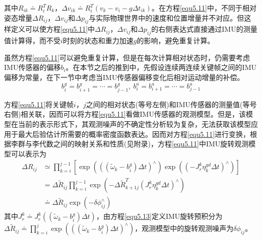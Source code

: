 其中$R_{ik} \doteq R_i^T R_k$，$\Delta v_{ik} \doteq R_i^T \left( v_k -v_i-g\Delta t_{ik} \right)$。在方程\ref{equ5.11}中，不同于相对姿态增量$\Delta R_{ij}$，$\Delta v_{ij}$和$\Delta p_{ij}$与实际物理世界中的速度和位置增量并不对应。但这样定义可以使方程\ref{equ5.11}中$\Delta R_{ij}$，$\Delta v_{ij}$和$\Delta p_{ij}$的右侧表达式直接通过IMU的测量值计算得，而不受$i$时刻的状态和重力加速$g$的影响，避免重复计算。

虽然方程\ref{equ5.11}可以避免重复计算，但是在每次计算相对状态时，仍需要考虑IMU传感器的偏移$b_i$。在本节之后的推到中，先假设连续两连续关键帧之间的IMU偏移为常量，在下一节中考虑当IMU传感器偏移变化后相对运动增量的补偿。
\begin{equation}
\label{equ5.12}
b_i^g = b_{i+1}^g = \cdots = b_{j-1}^g, \  b_i^a = b_{i+1}^a = \cdots = b_{j-1}^a
\end{equation}

方程\ref{equ5.11}将关键帧$i$，$j$之间的相对状态(等号左侧)和IMU传感器的测量值(等号右侧)相关联，因而可以将方程\ref{equ5.11}看做IMU传感器的观测模型。但是，该模型在当前的表示形式下，其观测噪声的不确定性分析较为复杂，无法获取该模型应用于最大后验估计所需要的概率密度函数表达。因而对方程\ref{equ5.11}进行变换，根据李群与李代数之间的映射关系和性质(见附录)，方程\ref{equ5.11}中IMU旋转观测模型可以表示为
\begin{equation}
\label{equ5.13}
\begin{aligned}
\Delta R_{ij} & \simeq \prod\limits_{k=i}^{j-1} \left[ \exp \left( \left( \left( \widetilde{\omega}_k - b_i^g \right) \Delta t \right)^{\wedge}  \right)  
\exp \left( \left( -J_r^k \eta_k^{gd} \Delta t \right)^{\wedge} \right)\right] \\
&= \Delta \widetilde{R}_{ij} \prod\limits_{k=i}^{j-1}\exp \left( -\Delta \widetilde{R}_{k+1j}^T \left( J_r^k \eta_k^{gd} \Delta t \right)^{\wedge}  \right) \\ 
& \doteq \Delta \widetilde{R}_{ij} \exp \left(  -\delta \phi_{ij} ^{\wedge}  \right)
\end{aligned}
\end{equation}
其中$J_r^k \doteq J_r^k( \left( \widetilde{\omega}_k - b_i^g \right) \Delta t)$，由方程\ref{equ5.13}定义IMU旋转预积分为$\Delta \widetilde{R}_{ij} \doteq \prod_{k=i}^j\exp \left( \left( \left( \widetilde{\omega}_k - b_i^g \right) \Delta t \right)^{\wedge}  \right)$，观测模型中的旋转观测噪声为$\delta \phi_{ij}$。

